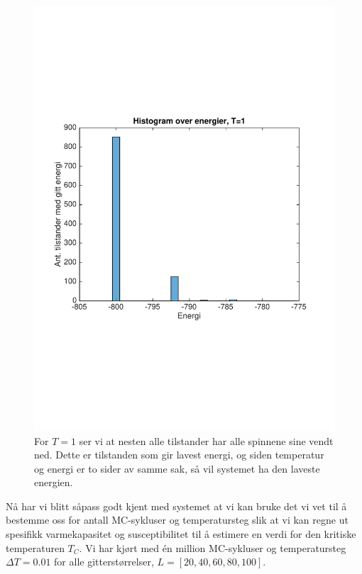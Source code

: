 \documentclass[norsk, 10pt]{article}
\begin{document}
\begin{figure}[H]
	\centering
	\includegraphics[scale = 0.6, trim = 1cm 8cm 1cm 8cm]{histogram_T1_L20.pdf}
	\caption{For $T=1$ ser vi at nesten alle tilstander har alle spinnene sine vendt ned. Dette er tilstanden som gir lavest energi, og siden temperatur og energi er to sider av samme sak, så vil systemet ha den laveste energien.}
	\label{fig:histT1L20}
\end{figure}

Nå har vi blitt såpass godt kjent med systemet at vi kan bruke det vi vet til å bestemme oss for antall MC-sykluser og temperatursteg slik at vi kan regne ut spesifikk varmekapasitet og  susceptibilitet til å estimere en verdi for den kritiske temperaturen $T_C$. Vi har kjørt med én million MC-sykluser og temperatursteg $\Delta T = 0.01$ for alle gitterstørrelser, $L=[20,40,60,80,100]$.
\end{document}
